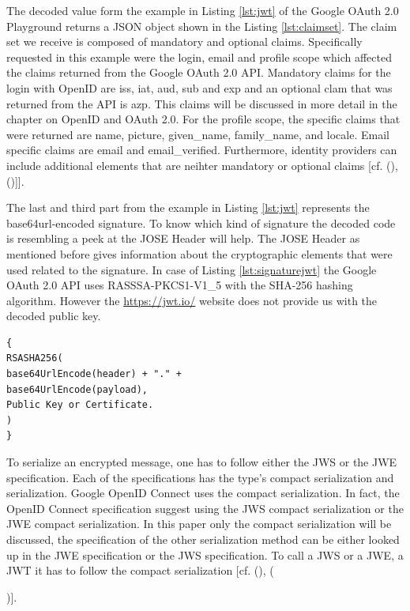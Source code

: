 {The decoded value form the example in Listing \ref{lst:jwt} of the Google OAuth 2.0 Playground \cite{Google:2018:OAuthPlayground} returns a JSON object shown in the Listing \ref{lst:claimset}. The claim set we receive is composed of mandatory and optional claims. Specifically requested in this example were the login, email and profile scope which affected the claims returned from the Google OAuth 2.0 API. Mandatory claims for the login with OpenID are iss, iat, aud, sub and exp and an optional clam that was returned from the API is azp. This claims will be discussed in more detail in the chapter on OpenID and OAuth 2.0. For the profile scope, the specific claims that were returned are name, picture, given\_name, family\_name, and locale. Email specific claims are email and email\_verified. Furthermore, identity providers can include additional elements that are neihter mandatory or optional claims [cf. ({\cite{Google:2018:OAuthPlayground}),(\cite{Siriwardena:JWTJWSJWE:2016})]}].

The last and third part from the example in  Listing \ref{lst:jwt}  represents the base64url-encoded signature. To know which kind of signature the decoded code is resembling a peek at the JOSE Header will help. The JOSE Header as mentioned before gives information about the cryptographic elements that were used related to the signature. In case of Listing \ref{lst:signaturejwt} the Google OAuth 2.0 API uses RASSSA-PKCS1-V1\_5 with the SHA-256 hashing algorithm. However the \href{https://jwt.io/} {https://jwt.io/} website does not provide us with the decoded public key. 

\begin{lstlisting}
{
RSASHA256(
base64UrlEncode(header) + "." +
base64UrlEncode(payload),
Public Key or Certificate.
)
}
\end{lstlisting}


To serialize an encrypted message, one has to follow either the JWS or the JWE specification. Each of the specifications has the type’s compact serialization and serialization. Google OpenID Connect uses the compact serialization. In fact, the OpenID Connect specification suggest using the JWS compact serialization or the JWE compact serialization. In this paper only the compact serialization will be discussed, the specification of the other serialization method can be either looked up in the JWE specification or the JWS specification. To call a JWS or a JWE, a JWT it has to follow the compact serialization [cf. (\cite{JWS:IETF:Jones:2015}), ({\cite{JWE:IETF:Jones:2015})].
	
}}
